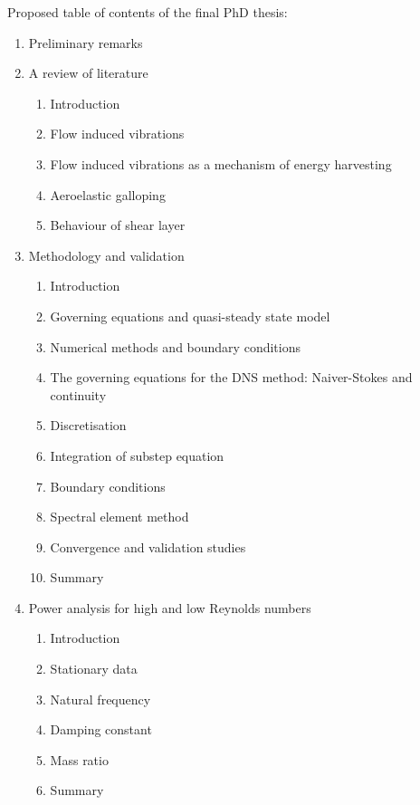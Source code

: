 \documentclass{article}
\begin{document}
%
%
Proposed table of contents of the final PhD thesis:
\begin{enumerate}
\item Preliminary remarks 
\item A review of literature
\begin{enumerate}[i]
\item Introduction
\item Flow induced vibrations 
\item Flow induced vibrations as a mechanism of energy harvesting
\item Aeroelastic galloping
\item Behaviour of shear layer 
\end{enumerate}
\item Methodology and validation
\begin{enumerate}[i]
\item Introduction
\item Governing equations and quasi-steady state model 
\item Numerical methods and boundary conditions 
\item The governing equations for the DNS method: Naiver-Stokes and continuity  
\item Discretisation  
\item Integration of substep equation 
\item Boundary conditions 
\item Spectral element method
\item Convergence and validation studies 
\item Summary
\end{enumerate}
\item Power analysis for high and low Reynolds numbers
\begin{enumerate}[i]
\item Introduction 
\item Stationary data 
\item Natural frequency 
\item Damping constant 
\item Mass ratio
\item Summary 
\end{enumerate}


\end{enumerate}
\end{document}
